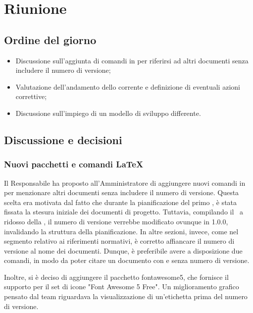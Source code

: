 \section{Riunione}
\subsection{Ordine del giorno}
\begin{itemize}
	\item Discussione sull'aggiunta di comandi in  per riferirsi ad altri documenti senza includere il numero di versione;
  \item Valutazione dell'andamento dello  corrente e definizione di eventuali azioni correttive;
  \item Discussione sull'impiego di un modello di sviluppo differente.
\end{itemize}

\subsection{Discussione e decisioni}

\subsubsection{Nuovi pacchetti e comandi LaTeX}
\par Il Responsabile ha proposto all'Amministratore di aggiungere nuovi comandi in  per menzionare altri documenti senza includere il numero di versione. Questa scelta era motivata dal fatto che durante la pianificazione del primo , è stata fissata la stesura iniziale dei documenti di progetto. Tuttavia, compilando il \PdP\ a ridosso della , il numero di versione verrebbe modificato ovunque in 1.0.0, invalidando la struttura della pianificazione. In altre sezioni, invece, come nel segmento relativo ai riferimenti normativi, è corretto affiancare il numero di versione al nome dei documenti. Dunque, è preferibile avere a disposizione due comandi, in modo da poter citare un documento con e senza numero di versione.
\par Inoltre, si è deciso di aggiungere il pacchetto fontawesome5, che fornisce il supporto  per il set di icone "Font Awesome 5 Free". Un miglioramento grafico pensato dal team riguardava la visualizzazione di un'etichetta prima del numero di versione.

